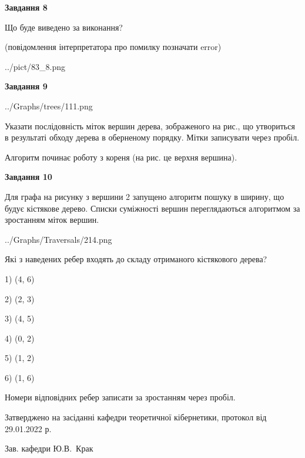 \documentclass[12pt, ukrainian]{article}
\begin{document}
{\begin {large}
{\begin {center}\textbf{Завдання 8}\end {center}}\par
Що буде виведено за виконання?\par
 (повідомлення інтерпретатора про помилку позначати error)\par
\begin{center}
	{../pict/83_8.png}
\end{center}
\newpage

{\begin {center}\textbf{Завдання 9}\end {center}}\par

\begin{center}
	{../Graphs/trees/111.png}
\end{center}
Указати послідовність міток вершин дерева, зображеного на рис., що утвориться в результаті обходу дерева в оберненому порядку. Мітки записувати через пробіл.\par Алгоритм починає роботу з кореня (на рис. це верхня вершина).\par
\newpage

{\begin {center}\textbf{Завдання 10}\end {center}}\par
Для графа на рисунку з вершини 2 запущено алгоритм пошуку в ширину, що будує кістякове дерево. Списки суміжності вершин переглядаються алгоритмом за зростанням міток вершин.\par
\begin{center}
	{../Graphs/Traversals/214.png}
\end{center}
\par Які з наведених ребер входять до складу отриманого кістякового дерева?\par
1) (4, 6)\par
2) (2, 3)\par
3) (4, 5)\par
4) (0, 2)\par
5) (1, 2)\par
6) (1, 6)\par
{\vskip 15pt} Номери відповідних ребер записати за зростанням через пробіл.\par
\newpage


\end {large}
}
{\smallskip \begin {small} Затверджено на засіданні кафедри теоретичної кібернетики, протокол  від   29.01.2022 р.\par\smallskip\smallskip
{\parbox {6.5 cm}{Зав. кафедри \dotfill Ю.В.~Крак}} \end{small}}
\end{document}
